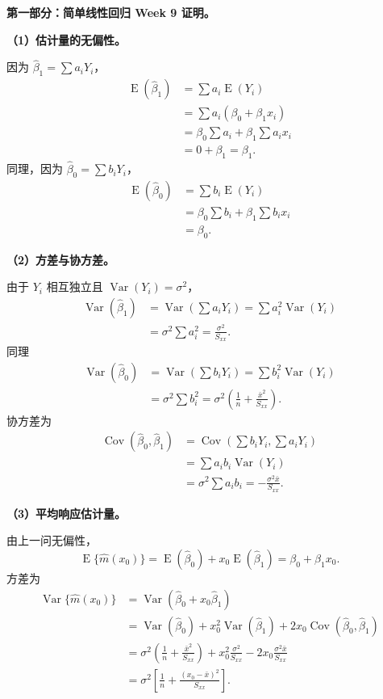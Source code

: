 \documentclass[11pt,a4paper]{article}
\newcommand{\E}{\operatorname{E}}
\newcommand{\Var}{\operatorname{Var}}
\newcommand{\Cov}{\operatorname{Cov}}
\begin{document}
\begin{solutionbox}
\textbf{第一部分：简单线性回归 Week 9 证明。}

\textbf{（1）估计量的无偏性。}

因为 $\hat\beta_1=\sum a_iY_i$，
\[
\begin{aligned}
  \E(\hat\beta_1)
  &=
  \sum a_i\E(Y_i)\\
  &=
  \sum a_i(\beta_0+\beta_1x_i)\\
  &=
  \beta_0\sum a_i+\beta_1\sum a_ix_i\\
  &=
  0+\beta_1=\boxed{\beta_1}.
\end{aligned}
\]
同理，因为 $\hat\beta_0=\sum b_iY_i$，
\[
\begin{aligned}
  \E(\hat\beta_0)
  &=
  \sum b_i\E(Y_i)\\
  &=
  \beta_0\sum b_i+\beta_1\sum b_ix_i\\
  &=
  \boxed{\beta_0}.
\end{aligned}
\]

\textbf{（2）方差与协方差。}

由于 $Y_i$ 相互独立且 $\Var(Y_i)=\sigma^2$，
\[
\begin{aligned}
  \Var(\hat\beta_1)
  &=
  \Var\left(\sum a_iY_i\right)
  =
  \sum a_i^2\Var(Y_i)\\
  &=
  \sigma^2\sum a_i^2
  =
  \boxed{\frac{\sigma^2}{S_{xx}}}.
\end{aligned}
\]
同理
\[
\begin{aligned}
  \Var(\hat\beta_0)
  &=
  \Var\left(\sum b_iY_i\right)
  =
  \sum b_i^2\Var(Y_i)\\
  &=
  \sigma^2\sum b_i^2
  =
  \boxed{\sigma^2\left(\frac1n+\frac{\bar x^2}{S_{xx}}\right)}.
\end{aligned}
\]
协方差为
\[
\begin{aligned}
  \Cov(\hat\beta_0,\hat\beta_1)
  &=
  \Cov\left(\sum b_iY_i,\sum a_iY_i\right)\\
  &=
  \sum a_ib_i\Var(Y_i)\\
  &=
  \sigma^2\sum a_ib_i
  =
  \boxed{-\frac{\sigma^2\bar x}{S_{xx}}}.
\end{aligned}
\]

\textbf{（3）平均响应估计量。}

由上一问无偏性，
\[
  \E\{\hat m(x_0)\}
  =
  \E(\hat\beta_0)+x_0\E(\hat\beta_1)
  =
  \boxed{\beta_0+\beta_1x_0}.
\]
方差为
\[
\begin{aligned}
  \Var\{\hat m(x_0)\}
  &=
  \Var(\hat\beta_0+x_0\hat\beta_1)\\
  &=
  \Var(\hat\beta_0)+x_0^2\Var(\hat\beta_1)
  +2x_0\Cov(\hat\beta_0,\hat\beta_1)\\
  &=
  \sigma^2\left(\frac1n+\frac{\bar x^2}{S_{xx}}\right)
  +x_0^2\frac{\sigma^2}{S_{xx}}
  -2x_0\frac{\sigma^2\bar x}{S_{xx}}\\
  &=
  \boxed{
  \sigma^2\left[
    \frac1n+\frac{(x_0-\bar x)^2}{S_{xx}}
  \right]}.
\end{aligned}
\]


\end{solutionbox}
\end{document}

